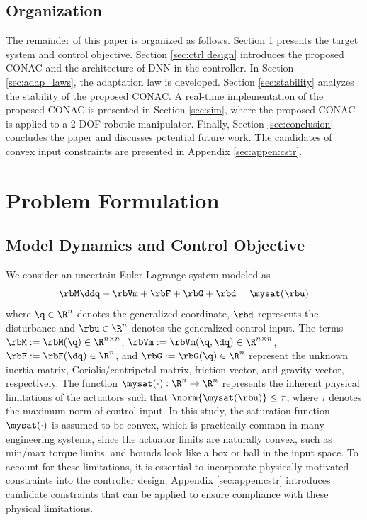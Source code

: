 \documentclass[journal]{IEEEtran}
\begin{document}
\subsection{Organization}

The remainder of this paper is organized as follows. 
Section \ref{sec:Problem Formulation} presents the target system and control objective.
Section \ref{sec:ctrl design} introduces the proposed CONAC and the architecture of DNN in the controller. 
In Section \ref{sec:adap_laws}, the adaptation law is developed.
Section \ref{sec:stability} analyzes the stability of the proposed CONAC.
A real-time implementation of the proposed CONAC is presented in Section \ref{sec:sim}, where the proposed CONAC is applied to a 2-DOF robotic manipulator.
Finally, Section \ref{sec:conclusion} concludes the paper and discusses potential future work.
The candidates of convex input constraints are presented in Appendix \ref{sec:appen:cstr}. 

\section{Problem Formulation}\label{sec:Problem Formulation}

\subsection{Model Dynamics and Control Objective}

We consider an uncertain Euler-Lagrange system modeled as
\begin{equation}
    \rbM\ddq + \rbVm + \rbF + \rbG + \rbd
    =
    \mysat(\rbu)
    \label{eq:sys1}
\end{equation}
where $\q\in \R^n$ denotes the generalized coordinate, $\rbd$ represents the disturbance and $\rbu\in\R^n$ denotes the generalized control input. 
The terms $\rbM:=\rbM(\q)\in\R^{n\times n}$, $\rbVm:=\rbVm(\q,\dq)\in\R^{n\times n}$, $\rbF:=\rbF(\dq)\in\R^{n}$, and $\rbG:=\rbG(\q)\in\R^{n}$ represent the unknown inertia matrix, Coriolis/centripetal matrix, friction vector, and gravity vector, respectively.
The function $\mysat(\cdot):\R^n\to\R^n$ represents the inherent physical limitations of the actuators such that $\norm{\mysat(\rbu)}\le \overline\tau$, where $\overline\tau$ denotes the maximum norm of control input.
In this study, the saturation function $\mysat(\cdot)$ is assumed to be convex, which is practically common in many engineering systems, since the actuator limits are naturally convex, such as min/max torque limits, and bounds look like a box or ball in the input space.
To account for these limitations, it is essential to incorporate physically motivated constraints into the controller design.
Appendix \ref{sec:appen:cstr} introduces candidate constraints that can be applied to ensure compliance with these physical limitations.
\end{document}

